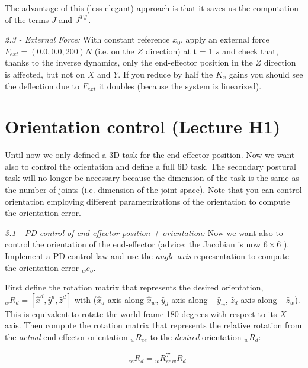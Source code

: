\documentclass[11pt]{article}
\begin{document}
The advantage of this (less elegant) approach is that it saves us the computation of the terms $\dot{J}$ and $J^{T\#}$.

\quad

\noindent
\textit{2.3 - External Force:}
With constant reference $x_0$,  apply an external force  $F_{ext} =(0.0,0.0,200) N$ (i.e. on the
$Z$ direction) at t = 1 $s$ and check that, thanks to the inverse dynamics, 
only the end-effector position in the $Z$ direction is affected, but not on $X$ and $Y$. 
If you reduce by half the $K_x$ gains you should see the deflection due to $F_{ext}$ it doubles (because the system is linearized).


\section{Orientation control (Lecture H1)}

Until now we only defined a 3D task for the end-effector position. Now we want also to control the orientation and define a full 6D task. 
The secondary postural task will no longer be necessary because the dimension of the task is the same as the number of joints (i.e. dimension of the joint space). Note that you can control orientation employing different parametrizations of the orientation to compute the orientation error. 

\quad

\noindent
\textit{3.1 - PD control of end-effector position + orientation:}
Now we want also to control  the orientation  of the end-effector (advice: the Jacobian is now $6\times6$ ). 
Implement a PD control law and use the \textit{angle-axis} representation to compute the orientation error ${}_we_o$. 

First define the rotation matrix that represents the desired orientation, ${}_wR_d = [\hat{x}^d, \hat{y}^d, \hat{z}^d]$ with  ($\hat{x}_d$ axis along $\hat{x}_w$, $\hat{y}_d$ axis  along $-\hat{y}_w$, $\hat{z}_d$ axis along $-\hat{z}_w$). This is equivalent to rotate the world frame 180 degrees with respect to its $X$ axis. %
Then compute the rotation matrix that represents the relative rotation from the \textit{actual} end-effector orientation ${}_wR_{ee}$ to the \textit{desired} orientation ${}_wR_d$:

\begin{align}
&{}_{ee}R_d = {}_wR_{ee}^T {}_wR_d
\end{align}
\end{document}
